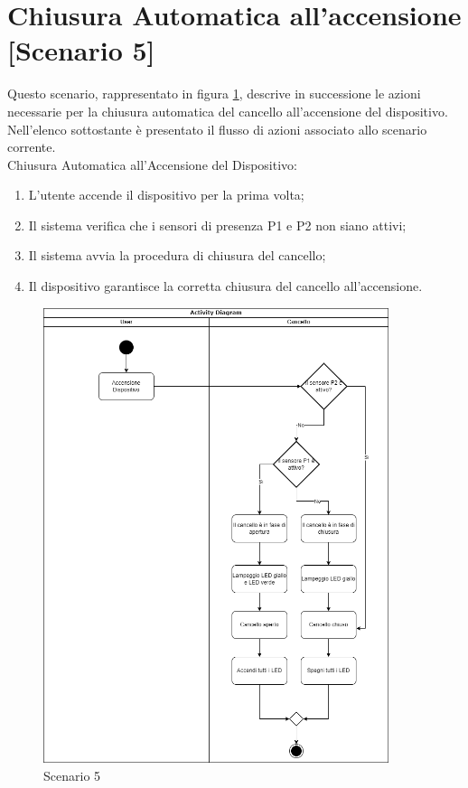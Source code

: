 \section{Chiusura Automatica all'accensione [Scenario 5]}
Questo scenario, rappresentato in figura \ref{scenario5}, descrive in successione le azioni necessarie per la chiusura automatica del cancello all'accensione del dispositivo.
Nell'elenco sottostante è presentato il flusso di azioni associato allo scenario corrente. \\

\noindent Chiusura Automatica all'Accensione del Dispositivo:

\begin{enumerate}
    \item L’utente accende il dispositivo per la prima volta;
    \item Il sistema verifica che i sensori di presenza P1 e P2 non siano attivi;
    \item Il sistema avvia la procedura di chiusura del cancello;
    \item Il dispositivo garantisce la corretta chiusura del cancello all'accensione.
\end{enumerate}

\begin{figure}[H]
    \centering
    \includegraphics[width=0.9\textwidth]{figures/scenario5.png}
    \caption{Scenario 5}
    \label{scenario5}
\end{figure}